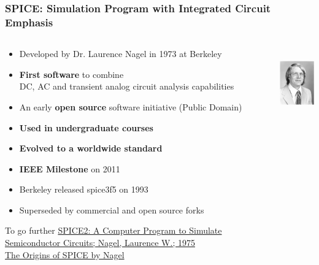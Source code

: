 
\begin{frame}
  \frametitle{SPICE: Simulation Program with Integrated Circuit Emphasis}
  \begin{columns}
    \begin{column}{.7\textwidth}
      \begin{itemize}
      \item Developed by Dr. Laurence Nagel in 1973 at Berkeley %
      \item \textbf{First software} to combine \\
        DC, AC and transient analog circuit analysis capabilities
      \item An early \textbf{open source} software initiative (Public Domain)
      \item \textbf{Used in undergraduate courses}
      \item \textbf{Evolved to a worldwide standard} %
      \item \textbf{IEEE Milestone} on 2011
      \item Berkeley released spice3f5 on 1993 %
      \item Superseded by commercial and open source forks \\[1em]
      \end{itemize}
      {\tiny%
        \begin{tabbing}
          To go further \=%
          \href{https://www2.eecs.berkeley.edu/Pubs/TechRpts/1975/9602.html}%
          {SPICE2: A Computer Program to Simulate Semiconductor Circuits; Nagel, Laurence W.; 1975} \\
          \> \href{http://www.omega-enterprises.net/The\%20Origins\%20of\%20SPICE.html}{The Origins of SPICE by Nagel}
        \end{tabbing}%
      }
    \end{column}
    \begin{column}{.3\textwidth}
      \begin{center}
        \includegraphics[height=3cm]{images/Larry-Nagel-portrait-young.png} \\[1cm]

\end{center}
\end{column}
\end{columns}
\end{frame}
